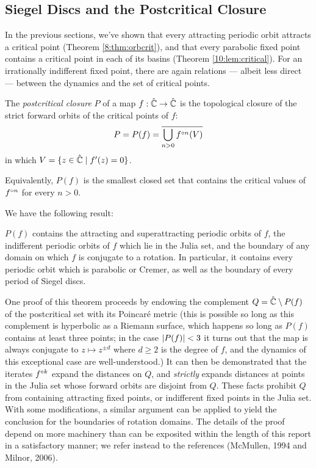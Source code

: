 \documentclass[../main.tex]{subfiles}
\newcommand\postcrit{P}
\newcommand\deriv[2]{{#1}'(#2)}
\begin{document}
\subsection{Siegel Discs and the Postcritical Closure}

In the previous sections, we've shown that every attracting periodic orbit attracts a critical point (Theorem \ref{8:thm:orbcrit}), and that every parabolic fixed point contains a critical point in each of its basins (Theorem \ref{10:lem:critical}). For an irrationally indifferent fixed point, there are again relations --- albeit less direct --- between the dynamics and the set of critical points.

\begin{dfn} The \emph{postcritical closure} $\postcrit$ of a map $f : \hat{\mathbb{C}} \to \hat{\mathbb{C}}$ is the topological closure of the strict forward orbits of the critical points of $f$:
\[
\postcrit = \postcrit(f) = \cl{\bigcup\limits_{n > 0} \iter{f}{n}(V)}
\]
in which $V = \{ z \in \hat{\C} \mid \deriv{f}{z} = 0\}$.
\end{dfn}

Equivalently, $\postcrit(f)$ is the smallest closed set that contains the critical values of $f^{\circ n}$ for every $n > 0$. 

We have the following result:

\begin{thm}\label{11:thm:postcrit}
 $\postcrit(f)$ contains the attracting and superattracting periodic orbits of $f$, the indifferent periodic orbits of $f$ which lie in the Julia set, and the boundary of any domain on which $f$ is conjugate to a rotation. In particular, it contains every periodic orbit which is parabolic or Cremer, as well as the boundary of every period of Siegel discs.
\end{thm}

One proof of this theorem proceeds by endowing the complement $Q = \hat{\C}\setminus\postcrit(f)$ of the postcritical set with its Poincaré metric (this is possible so long as this complement is hyperbolic as a Riemann surface, which happens so long as $\postcrit(f)$ contains at least three points; in the case $\abs{\postcrit(f)} < 3$ it turns out that the map is always conjugate to $z \mapsto z^{\pm d}$ where $d \ge 2$ is the degree of $f$, and the dynamics of this exceptional case are well-understood.) It can then be demonstrated that the iterates $f^{\circ k}$ expand the distances on $Q$, and \textit{strictly} expands distances at points in the Julia set whose forward orbits are disjoint from $Q$. These facts prohibit $Q$ from containing attracting fixed points, or indifferent fixed points in the Julia set. With some modifications, a similar argument can be applied to yield the conclusion for the boundaries of rotation domains. The details of the proof depend on more machinery than can be exposited within the length of this report in a satisfactory manner; we refer instead to the references (McMullen, 1994 and Milnor, 2006).
\end{document}
